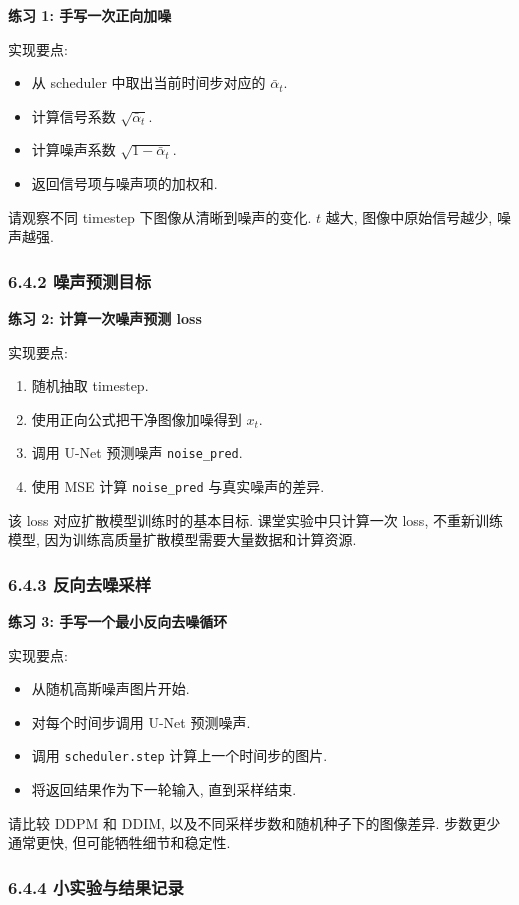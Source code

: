 \documentclass{../../nndlcourse}
\begin{document}
\textbf{练习 1: 手写一次正向加噪}

实现要点:
\begin{itemize}
    \item 从 scheduler 中取出当前时间步对应的 $\bar{\alpha}_t$.
    \item 计算信号系数 $\sqrt{\bar{\alpha}_t}$.
    \item 计算噪声系数 $\sqrt{1-\bar{\alpha}_t}$.
    \item 返回信号项与噪声项的加权和.
\end{itemize}
请观察不同 timestep 下图像从清晰到噪声的变化. $t$ 越大, 图像中原始信号越少, 噪声越强.

\subsubsection*{6.4.2 噪声预测目标}

\textbf{练习 2: 计算一次噪声预测 loss}

实现要点:
\begin{enumerate}
    \item 随机抽取 timestep.
    \item 使用正向公式把干净图像加噪得到 $x_t$.
    \item 调用 U-Net 预测噪声 \texttt{noise\_pred}.
    \item 使用 MSE 计算 \texttt{noise\_pred} 与真实噪声的差异.
\end{enumerate}
该 loss 对应扩散模型训练时的基本目标. 课堂实验中只计算一次 loss, 不重新训练模型, 因为训练高质量扩散模型需要大量数据和计算资源.

\subsubsection*{6.4.3 反向去噪采样}

\textbf{练习 3: 手写一个最小反向去噪循环}

实现要点:
\begin{itemize}
    \item 从随机高斯噪声图片开始.
    \item 对每个时间步调用 U-Net 预测噪声.
    \item 调用 \texttt{scheduler.step} 计算上一个时间步的图片.
    \item 将返回结果作为下一轮输入, 直到采样结束.
\end{itemize}
请比较 DDPM 和 DDIM, 以及不同采样步数和随机种子下的图像差异. 步数更少通常更快, 但可能牺牲细节和稳定性.

\subsubsection*{6.4.4 小实验与结果记录}
\end{document}
